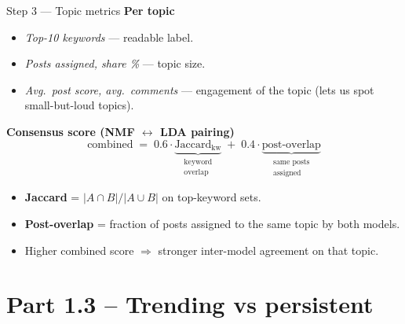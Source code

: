 \documentclass[10pt,aspectratio=169]{beamer}
\begin{document}
\begin{frame}{Step 3 — Topic metrics}
\textbf{Per topic}
\begin{itemize}
  \item \emph{Top-10 keywords} — readable label.
  \item \emph{Posts assigned, share \%} — topic size.
  \item \emph{Avg.\ post score, avg.\ comments} — engagement of the topic (lets us spot small-but-loud topics).
\end{itemize}

\medskip
\textbf{Consensus score (NMF $\leftrightarrow$ LDA pairing)}
\[
\text{combined} \;=\; 0.6\cdot\underbrace{\text{Jaccard}_{\text{kw}}}_{\substack{\text{keyword}\\ \text{overlap}}} \;+\; 0.4\cdot\underbrace{\text{post-overlap}}_{\substack{\text{same posts}\\ \text{assigned}}}
\]
\begin{itemize}
  \item \textbf{Jaccard} = $|A\cap B|/|A\cup B|$ on top-keyword sets.
  \item \textbf{Post-overlap} = fraction of posts assigned to the same topic by both models.
  \item Higher combined score $\Rightarrow$ stronger inter-model agreement on that topic.
\end{itemize}
\end{frame}

\section{Part 1.3 -- Trending vs persistent}
\end{document}
